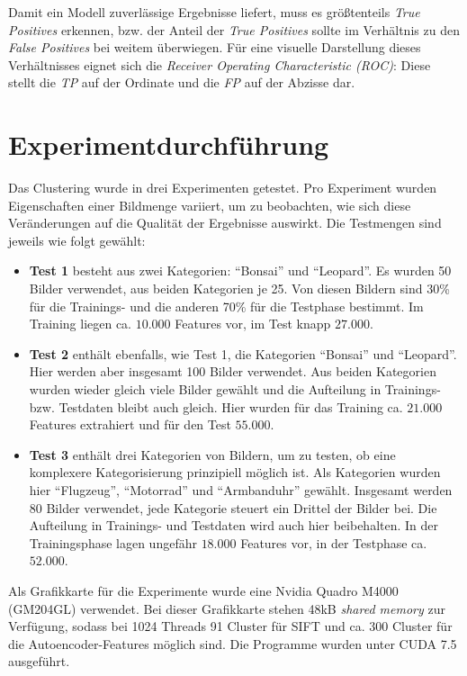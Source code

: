 Damit ein Modell zuverlässige Ergebnisse liefert, muss es größtenteils \textit{True Positives} erkennen, bzw. der Anteil der \textit{True Positives} sollte im Verhältnis zu den \textit{False Positives} bei weitem überwiegen. Für eine visuelle Darstellung dieses Verhältnisses eignet sich die \textit{Receiver Operating Characteristic (ROC)}: Diese stellt die \textit{TP} auf der Ordinate und die \textit{FP} auf der Abzisse dar.

\section{Experimentdurchführung}

Das Clustering wurde in drei Experimenten getestet. Pro Experiment wurden Eigenschaften einer Bildmenge variiert, um zu beobachten, wie sich diese Veränderungen auf die Qualität der Ergebnisse auswirkt. Die Testmengen sind jeweils wie folgt gewählt:

\begin{itemize}
	\item \textbf{Test 1} besteht aus zwei Kategorien: \enquote{Bonsai} und \enquote{Leopard}. Es wurden 50 Bilder verwendet, aus beiden Kategorien je 25. Von diesen Bildern sind 30\% für die Trainings- und die anderen 70\% für die Testphase bestimmt. Im Training liegen ca. $10.000$ Features vor, im Test knapp $27.000$.
	\item \textbf{Test 2} enthält ebenfalls, wie Test 1, die Kategorien \enquote{Bonsai} und \enquote{Leopard}. Hier werden aber insgesamt 100 Bilder verwendet. Aus beiden Kategorien wurden wieder gleich viele Bilder gewählt und die Aufteilung in Trainings- bzw. Testdaten bleibt auch gleich. Hier wurden für das Training ca. $21.000$ Features extrahiert und für den Test $55.000$.
	\item \textbf{Test 3} enthält drei Kategorien von Bildern, um zu testen, ob eine komplexere Kategorisierung prinzipiell möglich ist. Als Kategorien wurden hier \enquote{Flugzeug}, \enquote{Motorrad} und \enquote{Armbanduhr} gewählt. Insgesamt werden 80 Bilder verwendet, jede Kategorie steuert ein Drittel der Bilder bei. Die Aufteilung in Trainings- und Testdaten wird auch hier beibehalten. In der Trainingsphase lagen ungefähr $18.000$ Features vor, in der Testphase ca. $52.000$.
\end{itemize} 

Als Grafikkarte für die Experimente wurde eine Nvidia Quadro M4000 (GM204GL) verwendet. Bei dieser Grafikkarte stehen 48kB \textit{shared memory} zur Verfügung, sodass bei 1024 Threads 91 Cluster für SIFT und ca. 300 Cluster für die Autoencoder-Features möglich sind. Die Programme wurden unter CUDA 7.5 ausgeführt.\newline

